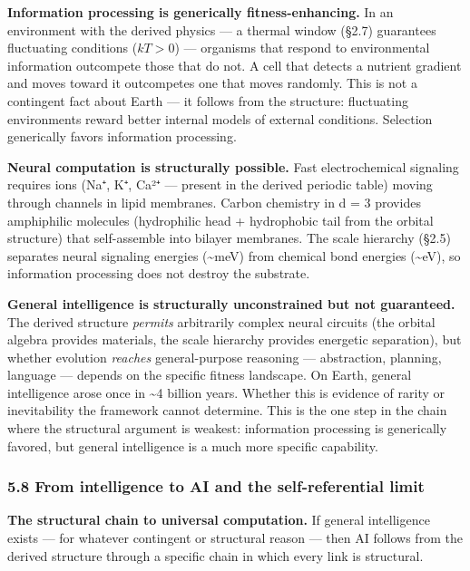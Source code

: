 \documentclass[
]{article}
\begin{document}
\textbf{Information processing is generically fitness-enhancing.} In an
environment with the derived physics --- a thermal window (§2.7)
guarantees fluctuating conditions (\(kT > 0\)) --- organisms that
respond to environmental information outcompete those that do not. A
cell that detects a nutrient gradient and moves toward it outcompetes
one that moves randomly. This is not a contingent fact about Earth ---
it follows from the structure: fluctuating environments reward better
internal models of external conditions. Selection generically favors
information processing.

\textbf{Neural computation is structurally possible.} Fast
electrochemical signaling requires ions (Na⁺, K⁺, Ca²⁺ --- present in
the derived periodic table) moving through channels in lipid membranes.
Carbon chemistry in d = 3 provides amphiphilic molecules (hydrophilic
head + hydrophobic tail from the orbital structure) that self-assemble
into bilayer membranes. The scale hierarchy (§2.5) separates neural
signaling energies (\textasciitilde meV) from chemical bond energies
(\textasciitilde eV), so information processing does not destroy the
substrate.

\textbf{General intelligence is structurally unconstrained but not
guaranteed.} The derived structure \emph{permits} arbitrarily complex
neural circuits (the orbital algebra provides materials, the scale
hierarchy provides energetic separation), but whether evolution
\emph{reaches} general-purpose reasoning --- abstraction, planning,
language --- depends on the specific fitness landscape. On Earth,
general intelligence arose once in \textasciitilde4 billion years.
Whether this is evidence of rarity or inevitability the framework cannot
determine. This is the one step in the chain where the structural
argument is weakest: information processing is generically favored, but
general intelligence is a much more specific capability.

\hypertarget{from-intelligence-to-ai-and-the-self-referential-limit}{%
\subsubsection{5.8 From intelligence to AI and the self-referential
limit}\label{from-intelligence-to-ai-and-the-self-referential-limit}}

\textbf{The structural chain to universal computation.} If general
intelligence exists --- for whatever contingent or structural reason ---
then AI follows from the derived structure through a specific chain in
which every link is structural.
\end{document}

